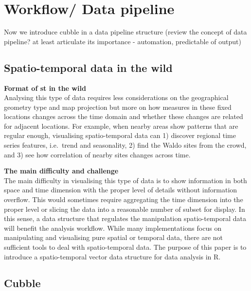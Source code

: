\documentclass[
]{jss}
\begin{document}
\newpage

\hypertarget{workflow-data-pipeline}{%
\section{Workflow/ Data pipeline}\label{workflow-data-pipeline}}

Now we introduce cubble in a data pipeline structure (review the concept
of data pipeline? at least articulate its importance - automation,
predictable of output)

\hypertarget{spatio-temporal-data-in-the-wild}{%
\subsection{Spatio-temporal data in the
wild}\label{spatio-temporal-data-in-the-wild}}

\textbf{Format of st in the wild}\\
Analysing this type of data requires less considerations on the
geographical geometry type and map projection but more on how measures
in these fixed locations changes across the time domain and whether
these changes are related for adjacent locations. For example, when
nearby areas show patterns that are regular enough, visualising
spatio-temporal data can 1) discover regional time series features,
i.e.~trend and seasonality, 2) find the Waldo sites from the crowd, and
3) see how correlation of nearby sites changes across time. \newline

\textbf{The main difficulty and challenge}\\
The main difficulty in visualising this type of data is to show
information in both space and time dimension with the proper level of
details without information overflow. This would sometimes require
aggregating the time dimension into the proper level or slicing the data
into a reasonable number of subset for display. In this sense, a data
structure that regulates the manipulation spatio-temporal data will
benefit the analysis workflow. While many implementations focus on
manipulating and visualising pure spatial or temporal data, there are
not sufficient tools to deal with spatio-temporal data. The purpose of
this paper is to introduce a spatio-temporal vector data structure for
data analysis in R.

\hypertarget{cubble}{%
\subsection{Cubble}\label{cubble}}
\end{document}
